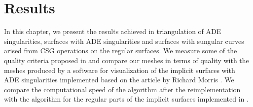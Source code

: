 \newcommand*{\MinNumberC}{0.5}%
\newcommand*{\MidNumberC}{0.75}%
\newcommand*{\MaxNumberC}{1.0}%
  
\newcommand{\ApplyGradientC}[1]{%
  \iftoggle{inTableHeader}{#1}{
    \ifdim #1 pt > \MidNumberC pt
        \pgfmathsetmacro{\PercentColor}{max(min(100.0*(#1 - \MidNumberC)/(\MaxNumberC-\MidNumberC),100.0),0.00)} %
        \colorbox{red!\PercentColor!yellow}{#1}
    \else
        \pgfmathsetmacro{\PercentColor}{max(min(100.0*(\MidNumberC - #1)/(\MidNumberC-\MinNumberC),100.0),0.00)} %
        \colorbox{green!\PercentColor!yellow}{#1}
    \fi
  }
  }

  
\newcommand*{\MinNumberD}{0.5}%
\newcommand*{\MidNumberD}{0.75}%
\newcommand*{\MaxNumberD}{1.0}%

\newcommand{\ApplyGradientD}[1]{%
  \iftoggle{inTableHeader}{#1}{
    \ifdim #1 pt > \MidNumberD pt
        \pgfmathsetmacro{\PercentColor}{max(min(100.0*(#1 - \MidNumberD)/(\MaxNumberD-\MidNumberD),100.0),0.00)} %
        \colorbox{red!\PercentColor!yellow}{#1}
    \else
        \pgfmathsetmacro{\PercentColor}{max(min(100.0*(\MidNumberD - #1)/(\MidNumberD-\MinNumberD),100.0),0.00)} %
        \colorbox{green!\PercentColor!yellow}{#1}
    \fi
  }
  }
  

\renewcommand{\arraystretch}{1}
\setlength{\fboxsep}{2mm} %
\setlength{\tabcolsep}{-4pt}

\chapter{Results}
\label{chap4}

In this chapter, we present the results achieved in triangulation of
ADE singularities, surfaces with ADE singularities and surfaces with 
sungular curves arised from CSG operations on the regular surfaces.
We measure some of the quality criteria proposed in \cite{korecova2021triangulation}
and compare our meshes in terms of quality with the meshes produced by a software 
for visualization of the implicit surfaces with ADE singularities implemented
based on the article by Richard Morris \cite{morris2003client}.
We compare the computational speed of the algorithm after the reimplementation
with the algorithm for the regular parts of the implicit surfaces 
implemented in \cite{korecova2021triangulation}.

